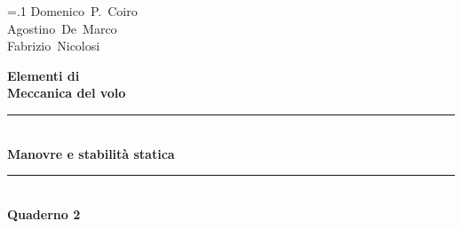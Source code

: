 %
%
%
%

\begin{titlepage}
\raggedright\leftskip=.1\textwidth
\large
Domenico~P.~Coiro\\
Agostino~De~Marco\\
Fabrizio~Nicolosi

\vspace*{\fill}

{\fontsize{46}{50}\selectfont%
   \bfseries
   Elementi di\\[10pt] Meccanica del volo
}%
\\[0.5\baselineskip]
{\color{blue!65!black}\rule{\linewidth}{0.4pt}}\mbox{}\\[0.7\baselineskip]
{\fontsize{36}{40}\selectfont%
   \bfseries
   Manovre e stabilità statica
}%
\\[0.5\baselineskip]
{\color{blue!65!black}\rule{\linewidth}{0.4pt}}\mbox{}\\[0.7\baselineskip]
{\fontsize{36}{40}\selectfont%
   \bfseries
   {\color{blue!65!black}Quaderno 2}\\[10pt]
}
\vspace*{\fill}

\normalsize\normalfont
{\color{magenta}\fbox{\texttt{\myDocVersion}}}\\[3pt]
\monthname[\the\month]\ \the\year%
\end{titlepage}
%
